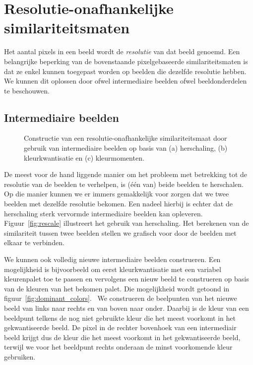 \section{Resolutie-onafhankelijke similariteitsmaten}
\label{sectie:res-onafh}

Het aantal pixels in een beeld wordt de \emph{resolutie} van dat beeld genoemd.
Een belangrijke beperking van de bovenstaande pixelgebaseerde similariteitsmaten is dat
ze enkel kunnen toegepast worden op beelden die dezelfde resolutie hebben.
We kunnen dit oplossen door ofwel intermediaire beelden ofwel beeldonderdelen te beschouwen.

\subsection{Intermediaire beelden}

\begin{figure}[tbp]
\begin{center}
\qquad
{}
\qquad
{}
\caption{\label{fig:intermediaire_beelden}Constructie van een resolutie-onafhankelijke similariteitsmaat door gebruik van intermediaire beelden op basis van (a) herschaling, (b) kleurkwantisatie en (c) kleurmomenten.}
\end{center}
\end{figure}

De meest voor de hand liggende manier om het probleem met betrekking tot de resolutie van de beelden
te verhelpen, is (\'e\'en van) beide beelden te herschalen. Op die manier kunnen we er immers gemakkelijk 
voor zorgen dat we twee beelden met dezelfde resolutie bekomen. Een nadeel hierbij is echter dat de
herschaling sterk vervormde intermediaire beelden kan opleveren. Figuur~\ref{fig:rescale} illustreert
het gebruik van herschaling. Het berekenen van de similariteit tussen twee beelden stellen we grafisch
voor door de beelden met elkaar te verbinden. 

We kunnen ook volledig nieuwe intermediaire beelden construeren. Een mogelijkheid is bijvoorbeeld om
eerst kleurkwantisatie met een variabel kleurenpalet toe te passen en vervolgens een
nieuw beeld te construeren op basis van de kleuren van het bekomen palet. Die mogelijkheid wordt getoond
in figuur~\ref{fig:dominant_colors}.  We construeren de beelpunten 
van het nieuwe beeld van links naar rechts en van boven naar onder. Daarbij is de kleur van een beeldpunt 
telkens de nog niet gebruikte kleur die het meest voorkomt in het gekwantiseerde beeld. 
De pixel in de rechter bovenhoek van een intermediair beeld krijgt dus de kleur die het meest voorkomt
in het gekwantiseerde beeld, terwijl we voor het beeldpunt rechts onderaan de minst voorkomende kleur
gebruiken. 

